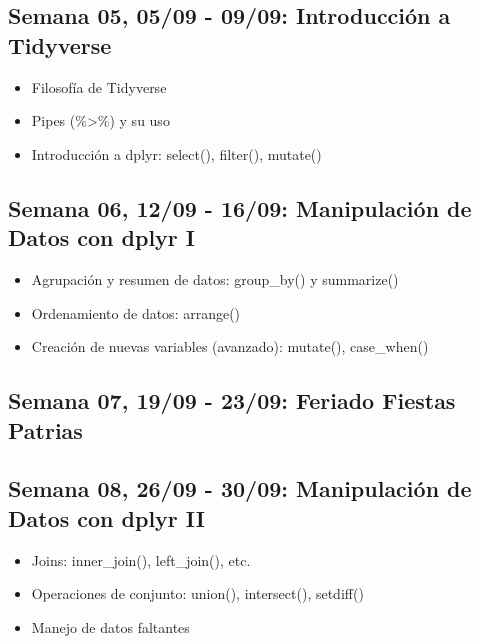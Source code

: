 \documentclass[11pt,letter,]{article}
\providecommand{\tightlist}{%
  \setlength{\itemsep}{0pt}\setlength{\parskip}{0pt}}
\begin{document}
\hypertarget{semana-05-0509---0909-introducciuxf3n-a-tidyverse}{%
\subsection{Semana 05, 05/09 - 09/09: Introducción a
Tidyverse}\label{semana-05-0509---0909-introducciuxf3n-a-tidyverse}}

\begin{itemize}
\tightlist
\item
  Filosofía de Tidyverse
\item
  Pipes (\%\textgreater\%) y su uso
\item
  Introducción a dplyr: select(), filter(), mutate()
\end{itemize}

\hypertarget{semana-06-1209---1609-manipulaciuxf3n-de-datos-con-dplyr-i}{%
\subsection{Semana 06, 12/09 - 16/09: Manipulación de Datos con dplyr
I}\label{semana-06-1209---1609-manipulaciuxf3n-de-datos-con-dplyr-i}}

\begin{itemize}
\tightlist
\item
  Agrupación y resumen de datos: group\_by() y summarize()
\item
  Ordenamiento de datos: arrange()
\item
  Creación de nuevas variables (avanzado): mutate(), case\_when()
\end{itemize}

\hypertarget{semana-07-1909---2309-feriado-fiestas-patrias}{%
\subsection{Semana 07, 19/09 - 23/09: Feriado Fiestas
Patrias}\label{semana-07-1909---2309-feriado-fiestas-patrias}}

\hypertarget{semana-08-2609---3009-manipulaciuxf3n-de-datos-con-dplyr-ii}{%
\subsection{Semana 08, 26/09 - 30/09: Manipulación de Datos con dplyr
II}\label{semana-08-2609---3009-manipulaciuxf3n-de-datos-con-dplyr-ii}}

\begin{itemize}
\tightlist
\item
  Joins: inner\_join(), left\_join(), etc.
\item
  Operaciones de conjunto: union(), intersect(), setdiff()
\item
  Manejo de datos faltantes
\end{itemize}
\end{document}
